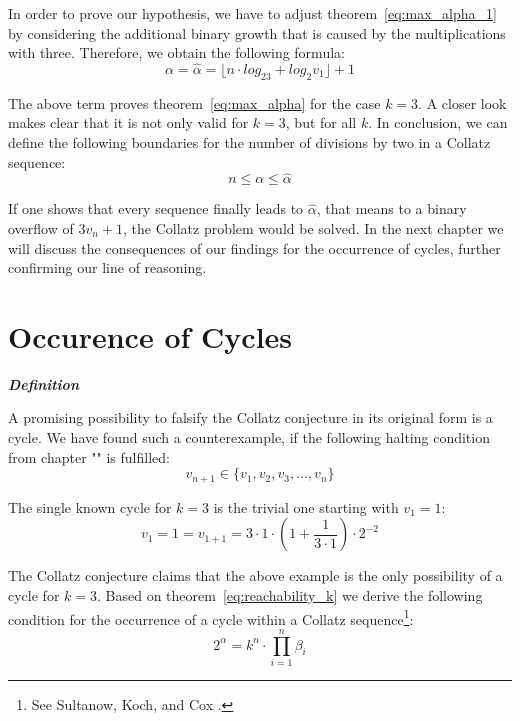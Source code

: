 \documentclass{SciPress_2015}
\renewcommand{\subsection}[1]{\textit{\textbf{#1}}}
\begin{document}
\par\medskip
In order to prove our hypothesis, we have to adjust theorem~\ref{eq:max_alpha_1} by considering the additional binary growth that is caused by the multiplications with three. Therefore, we obtain the following formula:
\begin{equation}
\label{eq:max_alpha_k}
	\alpha=\hat\alpha=\lfloor n\cdot log_23+log_2v_1\rfloor+1
\end{equation}

The above term proves theorem~\ref{eq:max_alpha} for the case $k=3$. A closer look makes clear that it is not only valid for $k=3$, but for all $k$. In conclusion, we can define the following boundaries for the number of divisions by two in a Collatz sequence:
\begin{equation}
n\le\alpha\le\hat\alpha
\end{equation}

If one shows that every sequence finally leads to $\hat\alpha$, that means to a binary overflow of $3v_n+1$, the Collatz problem would be solved. In the next chapter we will discuss the consequences of our findings for the occurrence of cycles, further confirming our line of reasoning.

\section{Occurence of Cycles}
\subsection{Definition}
\par\noindent
A promising possibility to falsify the Collatz conjecture in its original form is a cycle. We have found such a counterexample, if the following halting condition from chapter "" is fulfilled:
\[
v_{n+1}\in\{v_1,v_2,v_3,\ldots,v_n\}
\]
\par\noindent
The single known cycle for $k=3$ is the trivial one starting with $v_1=1$:
\begin{equation}
\label{eq:cycle}
	v_1=1=v_{1+1}=3\cdot1\cdot\left(1+\frac{1}{3\cdot1}\right)\cdot2^{-2}
\end{equation}

The Collatz conjecture claims that the above example is the only possibility of a cycle for $k=3$. Based on theorem~\ref{eq:reachability_k} we derive the following condition for the occurrence of a cycle within a Collatz sequence\footnote{See Sultanow, Koch, and Cox \cite[p.~11]{Ref_Sultanow_Koch_Cox_2020}.}:
\[
2^{\alpha}=k^n\cdot\prod_{i=1}^{n}\beta_i
\]
\end{document}
